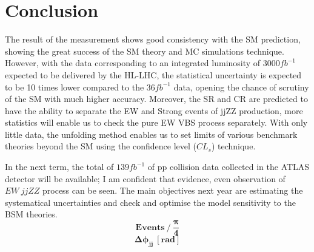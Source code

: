 \documentclass[12pt]{article}
\begin{document}
    \section{Conclusion}
        \par The result of the measurement shows good consistency with the SM prediction, showing the great success of 
        the SM theory and MC simulations technique. However, with the data corresponding to an integrated luminosity 
        of $3000fb^{-1}$ expected to be delivered by the HL-LHC\cite{ATL-PHYS-PUB-2019-005}, the statistical uncertainty 
        is expected to be 10 times lower compared to the $36fb^{-1}$ data, opening the chance of scrutiny of the SM with 
        much higher accuracy. Moreover, the SR and CR are predicted to have the ability to separate the EW and Strong 
        events of jjZZ production, more statistics will enable us to check the pure EW VBS process separately. 
        With only little data, the unfolding method enables us to set limits of various benchmark theories beyond the 
        SM using the confidence level ($CL_s$) technique\cite{Read_2002}. 
        \par In the next term, the total of $139fb^{-1}$ of pp collision data collected in the ATLAS detector will be available; I am
        confident that evidence, even observation of $EW\ jjZZ$ process can be seen.
        The main objectives next year are estimating the systematical uncertainties and check and optimise the model sensitivity 
        to the BSM theories. 
        $$\mathbf{Events\ /\ \frac{\pi}{4}}$$
        $$\mathbf{\Delta\phi_{jj}\ [rad]}$$
    
    
    
\end{document}
